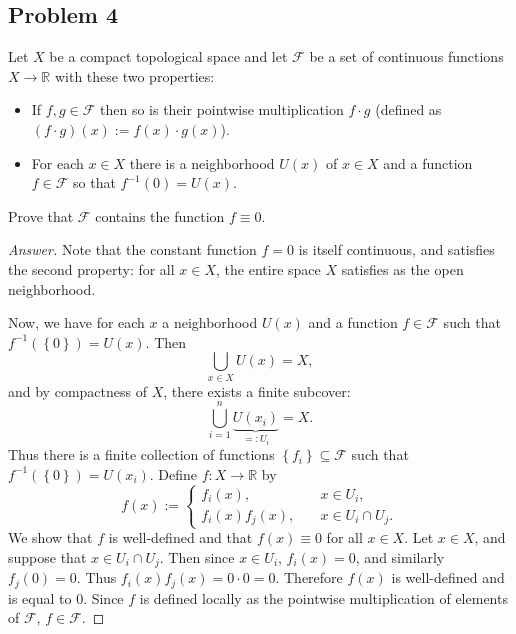 \documentclass[12pt]{article}
\newcommand{\real}{\mathbb{R}}
\newcommand\inv[1]{#1^{-1}}
\newcommand\paren[1]{\left( #1 \right)}
\newcommand\setb[1]{\left \{ #1 \right \}}
\theoremstyle{definition}
\begin{document}
\subsection{Problem 4}
Let $X$ be a compact topological space and let $\mathcal{F}$ be a set of continuous functions $X \to \real$ with these two properties:
\begin{itemize}
    \item If $f , g \in \mathcal{F}$ then so is their pointwise multiplication $f \cdot g$ (defined as $(f \cdot g)(x) := f(x) \cdot g(x)$).
    \item For each $x \in X$ there is a neighborhood $U(x)$ of $x \in X$ and a function $f \in \mathcal{F}$ so that $\inv{f}(0) = U(x)$.
\end{itemize}
Prove that $\mathcal{F}$ contains the function $f \equiv 0$.
\begin{proof}[Answer]
    Note that the constant function $f = 0$ is itself continuous, and satisfies the second property: for all $x \in X$, the entire space $X$ satisfies as the open neighborhood. 
    
    Now, we have for each $x$ a neighborhood $U(x)$ and a function $f \in \mathcal{F}$ such that $\inv{f} \paren{ \setb{ 0 } } = U(x)$. Then 
    \[
        \bigcup\limits_{x \in X} U(x) = X,
    \]
    and by compactness of $X$, there exists a finite subcover:
    \[
        \bigcup\limits_{i = 1}^n \underbrace{ U \paren{ x_i } }_{ =: U_i } = X.
    \]
    Thus there is a finite collection of functions $\setb{ f_i } \subseteq \mathcal{F}$ such that $\inv{f} \paren{ \setb{ 0 } } = U \paren{ x_i }$. Define $f : X \to \real$ by 
    \[
        f(x) := 
        \begin{cases}
            f_i(x) , & \quad x \in U_i, \\
            f_i(x) f_j(x) , & \quad x \in U_i \cap U_j.
        \end{cases}
    \]
    We show that $f$ is well-defined and that $f(x) \equiv 0$ for all $x \in X$. Let $x \in X$, and suppose that $x \in U_i \cap U_j$. Then since $x \in U_i$, $f_i(x) = 0$, and similarly $f_j(0) = 0$. Thus $f_i(x) f_j(x) = 0 \cdot 0 = 0$. Therefore $f(x)$ is well-defined and is equal to $0$. Since $f$ is defined locally as the pointwise multiplication of elements of $\mathcal{F}$, $f \in \mathcal{F}$.
\end{proof}
\end{document}
